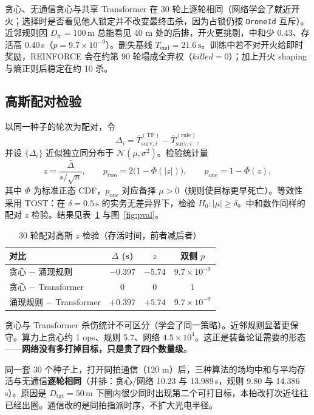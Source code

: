 \documentclass[12pt,a4paper]{article}
\begin{document}
贪心、无通信贪心与共享 Transformer 在 30 轮上逐轮相同（网络学会了就近开火；选择时是否看见他人锁定并不改变最终击杀，因为占锁仍按 \texttt{DroneId} 互斥）。近邻规则因 $D_{\mathrm{fr}}=100\,\mathrm{m}$ 总能看见 40 m 处的后排，开火更挑剔，中和少 0.43、存活高 0.40\,s（$p=9.7\times 10^{-9}$）。删失基线 $T_{\mathrm{end}}=21.6\,\mathrm{s}$。训练中若不对开火给即时奖励，REINFORCE 会在约第 90 轮塌成全弃权（$killed=0$）；加上开火 shaping 与熵正则后稳定在约 10 杀。

\subsection{高斯配对检验}

以同一种子的轮次为配对，令
\[
  \Delta_i = \overline{T}_{\mathrm{surv},i}^{\mathrm{(TF)}} - \overline{T}_{\mathrm{surv},i}^{\mathrm{(rule)}},
\]
并设 $\{\Delta_i\}$ 近似独立同分布于 $\mathcal{N}(\mu,\sigma^2)$。检验统计量
\[
  z = \frac{\bar\Delta}{s/\sqrt{n}},\qquad
  p_{\mathrm{two}} = 2\bigl(1-\Phi(|z|)\bigr),\qquad
  p_{\mathrm{one}} = 1-\Phi(z),
\]
其中 $\Phi$ 为标准正态 CDF，$p_{\mathrm{one}}$ 对应备择 $\mu>0$（规则使目标更早死亡）。等效性采用 TOST：在 $\delta=0.5\,\mathrm{s}$ 的实务无差异界下，检验 $H_0:|\mu|\ge\delta$。中和数作同样的配对 $z$ 检验。结果见表~\ref{tab:pval} 与图~\ref{fig:pval}。

\begin{table}[H]
\centering
\caption{30 轮配对高斯 $z$ 检验（存活时间，前者减后者）}
\label{tab:pval}
\begin{tabular}{lccc}
\toprule
对比 & $\bar\Delta$ (s) & $z$ & 双侧 $p$ \\
\midrule
贪心 $-$ 涌现规则 & $-0.397$ & $-5.74$ & $9.7\times 10^{-9}$ \\
贪心 $-$ Transformer & $0$ & $0$ & $1$ \\
涌现规则 $-$ Transformer & $+0.397$ & $+5.74$ & $9.7\times 10^{-9}$ \\
\bottomrule
\end{tabular}
\end{table}

贪心与 Transformer 杀伤统计不可区分（学会了同一策略）。近邻规则显著更保守。算力上贪心约 1 ops、规则 5.7、网络 $4.5\times 10^4$。这正是装备论证需要的形态——\textbf{网络没有多打掉目标，只是贵了四个数量级}。

同一套 30 个种子上，打开同拍通信（120 m）后，三种算法的场均中和与平均存活与无通信\textbf{逐轮相同}（并排：贪心/网络 10.23 与 13.989\,s，规则 9.80 与 14.386\,s）。原因是 $D_{\mathrm{tgt}}=50\,\mathrm{m}$ 下圈内很少同时出现第二个可打目标，本拍改打次近往往已经出圈。通信改的是同拍指派时序，不扩大光电半径。
\end{document}
